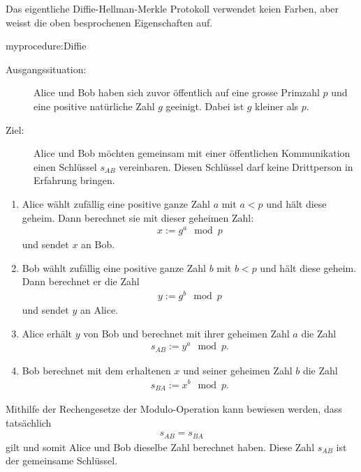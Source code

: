 Das eigentliche Diffie-Hellman-Merkle Protokoll verwendet keien Farben, aber weisst die oben besprochenen Eigenschaften auf.

\begin{myprocedure}{myprocedure:Diffie}
	\begin{description}
		\item[Ausgangssituation:] Alice und Bob haben sich zuvor öffentlich auf eine grosse Primzahl $p$ und eine positive natürliche Zahl $g$ geeinigt. Dabei ist $g$ kleiner als $p$.
		\item[Ziel:] Alice und Bob möchten gemeinsam mit einer öffentlichen Kommunikation einen Schlüssel $s_{AB}$ vereinbaren. Diesen Schlüssel darf keine Drittperson in Erfahrung bringen.
	\end{description}
	\begin{enumerate}
		\item Alice wählt zufällig eine positive ganze Zahl $a$ mit $a<p$ und hält diese geheim. Dann berechnet sie mit dieser geheimen Zahl:
		      \begin{align*}
			      x := g^a\mod p
		      \end{align*}
		      und sendet $x$ an Bob.
		\item Bob wählt zufällig eine positive ganze Zahl $b$ mit $b<p$ und hält diese geheim. Dann berechnet er die Zahl
		      \begin{align*}
			      y := g^b\mod p
		      \end{align*}
		      und sendet $y$ an Alice.
		\item Alice erhält $y$ von Bob und berechnet mit ihrer geheimen Zahl $a$ die Zahl
		      \begin{align*}
			      s_{AB} := y^a\mod p.
		      \end{align*}
		\item Bob berechnet mit dem erhaltenen $x$ und seiner geheimen Zahl $b$ die Zahl
		      \begin{align*}
			      s_{BA} := x^b\mod p.
		      \end{align*}
	\end{enumerate}
	Mithilfe der Rechengesetze der Modulo-Operation kann bewiesen werden, dass tatsächlich
	\begin{align*}
		s_{AB} = s_{BA}
	\end{align*}
	gilt und somit Alice und Bob dieselbe Zahl berechnet haben. Diese Zahl $s_{AB}$ ist der gemeinsame Schlüssel.
\end{myprocedure}

